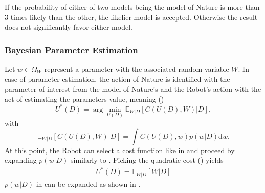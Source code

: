 \begin{definition}
	If the probability of either of two models being the model of Nature is more than 3 times likely than the other, the likelier model is accepted. Otherwise the result does not significantly favor either model.
\end{definition}

\subsubsection{Bayesian Parameter Estimation}
Let $w\in \Omega_W$ represent a parameter with the associated random variable $W$. In case of parameter estimation, the action of Nature is identified with the parameter of interest from the model of Nature's and the Robot's action with the act of estimating the parameters value, meaning ()
\begin{equation}
	U^*(D)=\arg\min_{U(D)}\mathbb{E}_{W|D}[C(U(D), W)|D],
\end{equation}
with
\begin{equation}
	\mathbb{E}_{W|D}[C(U(D), W)|D] = \int C(U(D),w)p(w|D) \mathrm{d}w.
\end{equation}
At this point, the Robot can select a cost function like in  and proceed by expanding $p(w|D)$ similarly to . Picking the quadratic cost () yields 
\begin{equation}
	\begin{split}
		U^*(D) = \mathbb{E}_{W|D}[W|D]
	\end{split}
	\label{eq:hest2}
\end{equation}
$p(w|D)$ in  can be expanded as shown in .

